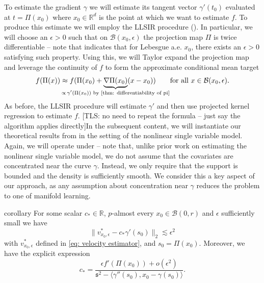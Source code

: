 \documentclass[11pt]{article}
\newcommand{\tls}[1]{{\color{cyan}[TLS: #1]}}
\begin{document}
To estimate the gradient $\gamma$ we will estimate its tangent vector $\gamma'(t_0)$ evaluated at $t = \Pi(x_0)$ where $x_0\in \mathbb{R}^d$ is the point at which we want to estimate $f$. To produce this estimate we will employ the LLSIR procedure (). In particular, we will choose an $\epsilon > 0$ such that on $\mathcal{B}(x_0, \epsilon)$ the projection map $\Pi$ is twice differentiable -- note that  indicates that for Lebesgue a.e. $x_0$, there exists an $\epsilon > 0$ satisfying such property. Using this, we will Taylor expand the projection map and leverage the continuity of $f$ to form the approximate conditional mean target
\begin{equation} \label{eq: surrogate decomposition colloquial}
    f(\Pi(x)) \approx f(\Pi(x_0) + \underbrace{\nabla\Pi(x_0)}_{\mathclap{\propto\, \gamma'(\Pi(x_0)) \text{ by \Cref{thm: differentiability of pi}}}}(x - x_0)) \qquad \text{for all }x \in \mathcal{B}(x_0, \epsilon).
\end{equation}
As before, the LLSIR procedure will estimate $\gamma'$ and then use projected kernel regression to estimate $f$. \tls{no need to repeat the formula -- just say the algorithm applies directly}In the subsequent content, we will instantiate our theoretical results from  in the setting of the nonlinear single variable model. Again, we will operate under  -- note that, unlike prior work on estimating the nonlinear single variable model, we do not assume that the covariates are concentrated near the curve $\gamma$. Instead, we only require that the support is bounded and the density is sufficiently smooth. We consider this a key aspect of our approach, as any assumption about concentration near $\gamma$ reduces the problem to one of manifold learning. 

\begin{restatable}{corollary}{}\label{corollary: population prop curve}
    For some scalar $c_* \in \mathbb{R}$, $p$-almost every $x_0 \in \mathcal{B}(0, r)$ and $\epsilon$ sufficiently small we have
    \[\|v^*_{x_0, \epsilon} - c_*\gamma'(s_0)\|_2 \lesssim \epsilon^2\]
    with $v^*_{x_0, \epsilon}$ defined in \cref{eq: velocity estimator}, and  $s_0 = \Pi(x_0)$. Moreover, we have the explicit expression
    \[c_* = \frac{\epsilon f'(\Pi(x_0))+ o(\epsilon^2)}{\mathfrak s ^2- \langle \gamma''(s_0), x_0 - \gamma(s_0)\rangle}.\]
\end{restatable}
\end{document}

